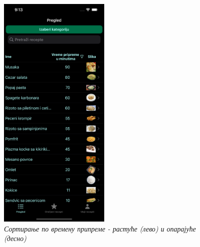 \documentclass[12pt,oneside]{memoir}
\begin{document}
\begin{figure} [H]
    \includegraphics[width=0.475\textwidth]{images/simulators/testing images/sorting desc.png}
    \caption{\textit{Сортирање по времену припреме - растуће (лево) и опарајуће (десно)}}
    \label{slika:приказ_сортирања}
\end{figure}
\end{document}
